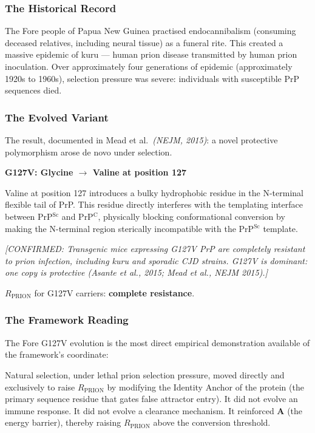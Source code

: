 \documentclass[12pt,a4paper]{article}
\newcommand{\rprion}{$R_{\mathrm{PRION}}$}
\newcommand{\prpc}{PrP$^{\mathrm{C}}$}
\newcommand{\prpsc}{PrP$^{\mathrm{Sc}}$}
\newcommand{\confirmed}[1]{\textit{[CONFIRMED: #1]}}
\begin{document}
\subsubsection{The Historical Record}

The Fore people of Papua New Guinea practised endocannibalism (consuming
deceased relatives, including neural tissue) as a funeral rite. This created
a massive epidemic of kuru --- human prion disease transmitted by human
prion inoculation. Over approximately four generations of epidemic
(approximately 1920s to 1960s), selection pressure was severe: individuals
with susceptible PrP sequences died.

\subsubsection{The Evolved Variant}

The result, documented in Mead et al.\ \textit{(NEJM, 2015)}: a novel
protective polymorphism arose de novo under selection.

\begin{center}
  \textbf{G127V: Glycine $\to$ Valine at position 127}
\end{center}

Valine at position 127 introduces a bulky hydrophobic residue in the
N-terminal flexible tail of PrP. This residue directly interferes with the
templating interface between \prpsc{} and \prpc{}, physically blocking
conformational conversion by making the N-terminal region sterically
incompatible with the \prpsc{} template.

\confirmed{Transgenic mice expressing G127V PrP are \textit{completely
resistant} to prion infection, including kuru and sporadic CJD strains.
G127V is dominant: one copy is protective (Asante et al., 2015; Mead et
al., NEJM 2015).}

\rprion{} for G127V carriers: \textbf{complete resistance}.

\subsubsection{The Framework Reading}

The Fore G127V evolution is the most direct empirical demonstration
available of the framework's coordinate:

Natural selection, under lethal prion selection pressure, moved directly
and exclusively to raise $R_{\mathrm{PRION}}$ by modifying the Identity
Anchor of the protein (the primary sequence residue that gates false
attractor entry). It did not evolve an immune response. It did not
evolve a clearance mechanism. It reinforced \textbf{A} (the energy
barrier), thereby raising $R_{\mathrm{PRION}}$ above the conversion
threshold.
\end{document}
